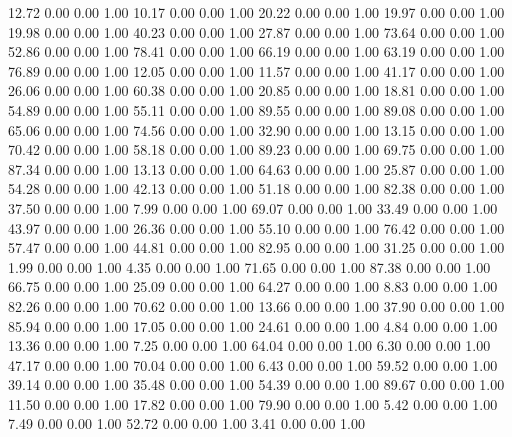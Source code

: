    12.72   0.00   0.00   1.00
   10.17   0.00   0.00   1.00
   20.22   0.00   0.00   1.00
   19.97   0.00   0.00   1.00
   19.98   0.00   0.00   1.00
   40.23   0.00   0.00   1.00
   27.87   0.00   0.00   1.00
   73.64   0.00   0.00   1.00
   52.86   0.00   0.00   1.00
   78.41   0.00   0.00   1.00
   66.19   0.00   0.00   1.00
   63.19   0.00   0.00   1.00
   76.89   0.00   0.00   1.00
   12.05   0.00   0.00   1.00
   11.57   0.00   0.00   1.00
   41.17   0.00   0.00   1.00
   26.06   0.00   0.00   1.00
   60.38   0.00   0.00   1.00
   20.85   0.00   0.00   1.00
   18.81   0.00   0.00   1.00
   54.89   0.00   0.00   1.00
   55.11   0.00   0.00   1.00
   89.55   0.00   0.00   1.00
   89.08   0.00   0.00   1.00
   65.06   0.00   0.00   1.00
   74.56   0.00   0.00   1.00
   32.90   0.00   0.00   1.00
   13.15   0.00   0.00   1.00
   70.42   0.00   0.00   1.00
   58.18   0.00   0.00   1.00
   89.23   0.00   0.00   1.00
   69.75   0.00   0.00   1.00
   87.34   0.00   0.00   1.00
   13.13   0.00   0.00   1.00
   64.63   0.00   0.00   1.00
   25.87   0.00   0.00   1.00
   54.28   0.00   0.00   1.00
   42.13   0.00   0.00   1.00
   51.18   0.00   0.00   1.00
   82.38   0.00   0.00   1.00
   37.50   0.00   0.00   1.00
    7.99   0.00   0.00   1.00
   69.07   0.00   0.00   1.00
   33.49   0.00   0.00   1.00
   43.97   0.00   0.00   1.00
   26.36   0.00   0.00   1.00
   55.10   0.00   0.00   1.00
   76.42   0.00   0.00   1.00
   57.47   0.00   0.00   1.00
   44.81   0.00   0.00   1.00
   82.95   0.00   0.00   1.00
   31.25   0.00   0.00   1.00
    1.99   0.00   0.00   1.00
    4.35   0.00   0.00   1.00
   71.65   0.00   0.00   1.00
   87.38   0.00   0.00   1.00
   66.75   0.00   0.00   1.00
   25.09   0.00   0.00   1.00
   64.27   0.00   0.00   1.00
    8.83   0.00   0.00   1.00
   82.26   0.00   0.00   1.00
   70.62   0.00   0.00   1.00
   13.66   0.00   0.00   1.00
   37.90   0.00   0.00   1.00
   85.94   0.00   0.00   1.00
   17.05   0.00   0.00   1.00
   24.61   0.00   0.00   1.00
    4.84   0.00   0.00   1.00
   13.36   0.00   0.00   1.00
    7.25   0.00   0.00   1.00
   64.04   0.00   0.00   1.00
    6.30   0.00   0.00   1.00
   47.17   0.00   0.00   1.00
   70.04   0.00   0.00   1.00
    6.43   0.00   0.00   1.00
   59.52   0.00   0.00   1.00
   39.14   0.00   0.00   1.00
   35.48   0.00   0.00   1.00
   54.39   0.00   0.00   1.00
   89.67   0.00   0.00   1.00
   11.50   0.00   0.00   1.00
   17.82   0.00   0.00   1.00
   79.90   0.00   0.00   1.00
    5.42   0.00   0.00   1.00
    7.49   0.00   0.00   1.00
   52.72   0.00   0.00   1.00
    3.41   0.00   0.00   1.00
